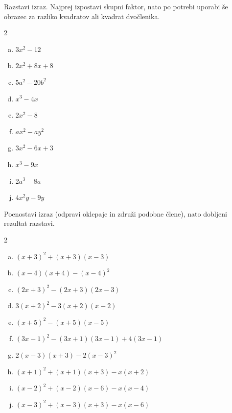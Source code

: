 \documentclass[a4paper,12pt]{letter}
\begin{document}
\begin{naloga}
Razstavi izraz. Najprej izpostavi skupni faktor, nato po potrebi uporabi \v{s}e obrazec za razliko kvadratov
ali kvadrat dvo\v{c}lenika.

\begin{multicols}{2}
\begin{enumerate}[a.)]
\item $3x^2-12$
\item $2x^2+8x+8$
\item $5a^2-20b^2$
\item $x^3-4x$
\item $2x^2-8$
\item $ax^2-ay^2$
\item $3x^2-6x+3$
\item $x^3-9x$
\item $2a^3-8a$
\item $4x^2y-9y$
\end{enumerate}
\end{multicols}
\end{naloga}

\begin{naloga}
Poenostavi izraz (odpravi oklepaje in zdru\v{z}i podobne \v{c}lene), nato dobljeni rezultat razstavi.

\begin{multicols}{2}
\begin{enumerate}[a.)]
\item $(x+3)^2+(x+3)(x-3)$
\item $(x-4)(x+4)-(x-4)^2$
\item $(2x+3)^2-(2x+3)(2x-3)$
\item $3(x+2)^2-3(x+2)(x-2)$
\item $(x+5)^2-(x+5)(x-5)$
\item $(3x-1)^2-(3x+1)(3x-1)+4(3x-1)$
\item $2(x-3)(x+3)-2(x-3)^2$
\item $(x+1)^2+(x+1)(x+3)-x(x+2)$
\item $(x-2)^2+(x-2)(x-6)-x(x-4)$
\item $(x-3)^2+(x-3)(x+3)-x(x-6)$
\end{enumerate}
\end{multicols}
\end{naloga}
\end{document}
